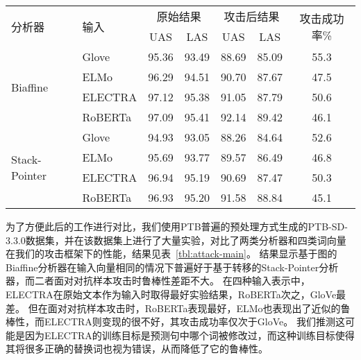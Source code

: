 \begin{table}[htbp]
    \vspace{0.5em}\centering\wuhao
	\begin{tabular}{llccccc}
		\toprule[1.5pt]
		\multirow{2}{*}{分析器}&\multirow{2}{*}{输入}& \multicolumn{2}{c}{原始结果} & \multicolumn{2}{c}{攻击后结果} & \multirow{2}{*}{攻击成功率\%} \\
		\cmidrule(r){3-4} \cmidrule(r){5-6}
		& & UAS & LAS & UAS & LAS \\
		\midrule[1pt]
		\multirow{4}{*}{ Biaffine} & Glove &95.36 & 93.49 &88.69 &85.09 &55.3 \\
		& ELMo  &96.29 &94.51  &90.70 &87.67 &47.5 \\
		& ELECTRA &97.12 & 95.38 &91.05 &87.79 &50.6 \\
		& RoBERTa &97.09 & 95.41 &92.14 &89.42 &46.1 \\
		\hline
		\multirow{4}{*}{ Stack-Pointer} & Glove &94.93 & 93.05 &88.26 &84.64 &52.6 \\
		& ELMo    &95.69 & 93.77 &89.57 &86.49 &46.8 \\
		& ELECTRA &96.94 & 95.19 &90.69 &87.47 &50.3 \\
		& RoBERTa &96.93 & 95.20 &91.58 &88.84 &45.1 \\
		\bottomrule[1.5pt]
	\end{tabular}
\end{table}

为了方便此后的工作进行对比，我们使用PTB普遍的预处理方式生成的PTB-SD-3.3.0数据集，并在该数据集上进行了大量实验，对比了两类分析器和四类词向量在我们的攻击框架下的性能，结果见表~\ref{tbl:attack-main}。
结果显示基于图的Biaffine分析器在输入向量相同的情况下普遍好于基于转移的Stack-Pointer分析器，而二者面对对抗样本攻击时鲁棒性差距不大。
在四种输入表示中，ELECTRA在原始文本作为输入时取得最好实验结果，RoBERTa次之，GloVe最差。
但在面对对抗样本攻击时，RoBERTa表现最好，ELMo也表现出了近似的鲁棒性，而ELECTRA则变现的很不好，其攻击成功率仅次于GloVe。
我们推测这可能是因为ELECTRA的训练目标是预测句中哪个词被修改过，而这种训练目标使得其将很多正确的替换词也视为错误，从而降低了它的鲁棒性。


